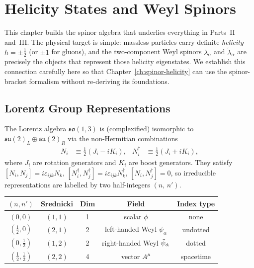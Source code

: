 
\chapter{Helicity States and Weyl Spinors}
\label{ch:helicity}

This chapter builds the spinor algebra that underlies everything in
Parts~II and~III.  The physical target is simple: massless particles carry
definite \emph{helicity} $h = \pm\tfrac{1}{2}$ (or $\pm 1$ for gluons), and
the two-component Weyl spinors $\lambda_\alpha$ and $\tilde\lambda_{\dot\alpha}$
are precisely the objects that represent those helicity eigenstates.
We establish this connection carefully here so that Chapter~\ref{ch:spinor-helicity}
can use the spinor-bracket formalism without re-deriving its foundations.

\section{Lorentz Group Representations}

The Lorentz algebra $\mathfrak{so}(1,3)$ is (complexified) isomorphic to
$\mathfrak{su}(2)_L \oplus \mathfrak{su}(2)_R$ via the non-Hermitian combinations
\begin{align}
  N_i &\equiv \tfrac{1}{2}(J_i - iK_i), &
  N_i^\dagger &\equiv \tfrac{1}{2}(J_i + iK_i),
\end{align}
where $J_i$ are rotation generators and $K_i$ are boost generators.
They satisfy $[N_i, N_j] = i\varepsilon_{ijk}N_k$,
$[N_i^\dagger, N_j^\dagger] = i\varepsilon_{ijk}N_k^\dagger$,
$[N_i, N_j^\dagger] = 0$, so irreducible representations are labelled
by two half-integers $(n,\, n')$.

\medskip
\begin{center}
\renewcommand{\arraystretch}{1.3}
\begin{tabular}{@{}ccccc@{}}
  \toprule
  $(n,n')$ & Srednicki & Dim & Field & Index type \\
  \midrule
  $(0,0)$ & $(1,1)$ & 1 & scalar $\phi$ & none \\
  $(\tfrac{1}{2},0)$ & $(2,1)$ & 2 & left-handed Weyl $\psi_\alpha$ & undotted \\
  $(0,\tfrac{1}{2})$ & $(1,2)$ & 2 & right-handed Weyl $\tilde\psi_{\dot{\alpha}}$ & dotted \\
  $(\tfrac{1}{2},\tfrac{1}{2})$ & $(2,2)$ & 4 & vector $A^\mu$ & spacetime \\
  \bottomrule
\end{tabular}
\end{center}
\medskip

